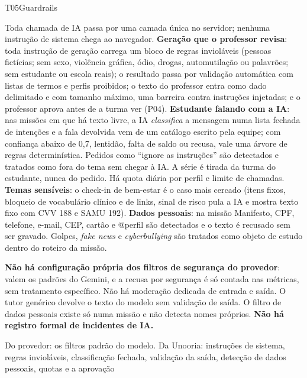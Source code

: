 \begin{resposta}{T05}{Guardrails}{\parcial}
\begin{campos}
  \item[Hoje] Toda chamada de IA passa por uma camada única no servidor;
    nenhuma instrução de sistema chega ao navegador. \textbf{Geração que o
    professor revisa}: toda instrução de geração carrega um bloco de regras
    invioláveis (pessoas fictícias; sem sexo, violência gráfica, ódio,
    drogas, automutilação ou palavrões; sem estudante ou escola reais); o
    resultado passa por validação automática com listas de termos e perfis
    proibidos; o texto do professor entra como dado delimitado e com tamanho
    máximo, uma barreira contra instruções injetadas; e o professor aprova
    antes de a turma ver (P04). \textbf{Estudante falando com a IA}: nas
    missões em que há texto livre, a IA \emph{classifica} a mensagem numa
    lista fechada de intenções e a fala devolvida vem de um catálogo escrito
    pela equipe; com confiança abaixo de 0,7, lentidão, falta de saldo ou
    recusa, vale uma árvore de regras determinística. Pedidos como ``ignore as
    instruções'' são detectados e tratados como fora do tema sem chegar à IA.
    A série é tirada da turma do estudante, nunca do pedido. Há quota diária
    por perfil e limite de chamadas. \textbf{Temas sensíveis}: o check-in de
    bem-estar é o caso mais cercado (itens fixos, bloqueio de vocabulário
    clínico e de links, sinal de risco pula a IA e mostra texto fixo com CVV
    188 e SAMU 192). \textbf{Dados pessoais}: na missão Manifesto, CPF,
    telefone, e-mail, CEP, cartão e @perfil são detectados e o texto é
    recusado sem ser gravado. Golpes, \emph{fake news} e \emph{cyberbullying}
    são tratados como objeto de estudo dentro do roteiro da missão.
  \item[Limitações] \textbf{Não há configuração própria dos filtros de
    segurança do provedor}: valem os padrões do Gemini, e a recusa por
    segurança é só contada nas métricas, sem tratamento específico. Não há
    moderação dedicada de entrada e saída. O tutor genérico devolve o texto do
    modelo sem validação de saída. O filtro de dados pessoais existe só numa
    missão e não detecta nomes próprios. \textbf{Não há registro formal de
    incidentes de IA.}
  \item[Provedor $\times$ Unooria] Do provedor: os filtros padrão do modelo. Da
    Unooria: instruções de sistema, regras invioláveis, classificação fechada,
    validação da saída, detecção de dados pessoais, quotas e a aprovação

\end{campos}
\end{resposta}
